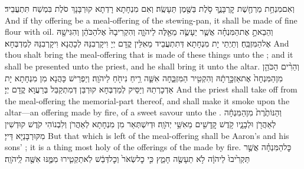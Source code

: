 {וְאִם\maqqaf מִנְחַ֥ת מַרְחֶ֖שֶׁת קׇרְבָּנֶ֑ךָ סֹ֥לֶת בַּשֶּׁ֖מֶן תֵּעָשֶֽׂה׃}
{וְאִם מִנְחָתָא רָדְתָא קוּרְבָּנָךְ סֹלֶת בִּמְשַׁח תִּתְעֲבֵיד׃}
{And if thy offering be a meal-offering of the stewing-pan, it shall be made of fine flour with oil.}{}
{וְהֵבֵאתָ֣ אֶת\maqqaf הַמִּנְחָ֗ה אֲשֶׁ֧ר יֵעָשֶׂ֛ה מֵאֵ֖לֶּה לַיהֹוָ֑ה וְהִקְרִיבָהּ֙ אֶל\maqqaf הַכֹּהֵ֔ן וְהִגִּישָׁ֖הּ אֶל\maqqaf הַמִּזְבֵּֽחַ׃}
{וְתַיְתֵי יָת מִנְחָתָא דְּתִתְעֲבֵיד מֵאִלֵּין קֳדָם יְיָ וִיקָרְבִנַּהּ לְכָהֲנָא וִיקָרְבִנַּהּ לְמַדְבְּחָא׃}
{And thou shalt bring the meal-offering that is made of these things unto the \lord; and it shall be presented unto the priest, and he shall bring it unto the altar.}{}
{וְהֵרִ֨ים הַכֹּהֵ֤ן מִן\maqqaf הַמִּנְחָה֙ אֶת\maqqaf אַזְכָּ֣רָתָ֔הּ וְהִקְטִ֖יר הַמִּזְבֵּ֑חָה אִשֵּׁ֛ה רֵ֥יחַ נִיחֹ֖חַ לַיהֹוָֽה׃}
{וְיַפְרֵישׁ כָּהֲנָא מִן מִנְחָתָא יָת אַדְכָרְתַהּ וְיַסֵּיק לְמַדְבְּחָא קוּרְבַּן דְּמִתְקַבַּל בְּרַעֲוָא קֳדָם יְיָ׃}
{And the priest shall take off from the meal-offering the memorial-part thereof, and shall make it smoke upon the altar—an offering made by fire, of a sweet savour unto the \lord.}{}
{וְהַנּוֹתֶ֙רֶת֙ מִן\maqqaf הַמִּנְחָ֔ה לְאַהֲרֹ֖ן וּלְבָנָ֑יו קֹ֥דֶשׁ קׇֽדָשִׁ֖ים מֵאִשֵּׁ֥י יְהֹוָֽה׃}
{וּדְיִשְׁתְּאַר מִן מִנְחָתָא לְאַהֲרֹן וְלִבְנוֹהִי קֹדֶשׁ קוּדְשִׁין מִקּוּרְבָּנַיָּא דַּייָ׃}
{But that which is left of the meal-offering shall be Aaron’s and his sons’ ; it is a thing most holy of the offerings of the \lord\space made by fire.}{}
{כׇּל\maqqaf הַמִּנְחָ֗ה אֲשֶׁ֤ר תַּקְרִ֙יבוּ֙ לַיהֹוָ֔ה לֹ֥א תֵעָשֶׂ֖ה חָמֵ֑ץ כִּ֤י כׇל\maqqaf שְׂאֹר֙ וְכׇל\maqqaf דְּבַ֔שׁ לֹֽא\maqqaf תַקְטִ֧ירוּ מִמֶּ֛נּוּ אִשֶּׁ֖ה לַֽיהֹוָֽה׃}
